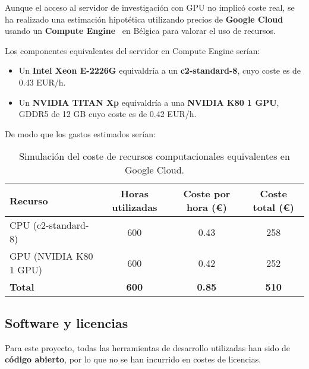 Aunque el acceso al servidor de investigación con GPU no implicó coste real,
se ha realizado una estimación hipotética utilizando precios de \textbf{Google Cloud}~\cite{OverviewGoogleCloud}
usando un \textbf{Compute Engine}~\cite{WhatCloudRun} en Bélgica para valorar el uso de recursos.


Los componentes equivalentes del servidor en Compute Engine serían:
\begin{itemize}
    \item Un \textbf{Intel Xeon E-2226G} equivaldría a un \textbf{c2-standard-8}, cuyo coste es de 0.43 EUR/h.
    \item Un \textbf{NVIDIA TITAN Xp} equivaldría a una \textbf{NVIDIA K80 1 GPU}, GDDR5 de 12 GB cuyo coste es de 0.42
          EUR/h.
\end{itemize}

De modo que los gastos estimados serían:
\begin{table}[htp]\label{tab:recursos-computacionales}
    \centering
    \begin{adjustbox}{width=\linewidth}
        \begin{tabular}{|l|c|c|c|}
            \hline
            \textbf{Recurso}       & \textbf{Horas utilizadas} & \textbf{Coste por hora (€)} &
            \textbf{Coste total (€)}                                                                        \\ \hline
            CPU (c2-standard-8)    & 600                       & 0.43                        & 258          \\
            GPU (NVIDIA K80 1 GPU) & 600                       & 0.42                        & 252          \\ \hline
            \textbf{Total}         & \textbf{600}              & \textbf{0.85}               & \textbf{510} \\ \hline
        \end{tabular}
    \end{adjustbox}
    \caption{Simulación del coste de recursos computacionales equivalentes en Google Cloud.}
\end{table}


\subsection{Software y licencias}\label{subsec:software-y-licencias}
Para este proyecto, todas las herramientas de desarrollo utilizadas han sido de \textbf{código abierto},
por lo que no se han incurrido en costes de licencias.

